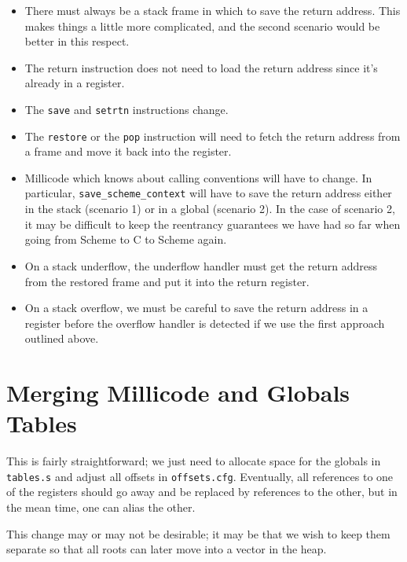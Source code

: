\begin{itemize}
\item
There must always be a stack frame in which to save the return address.
This makes things a little more complicated, and the second scenario would
be better in this respect.

\item
The return instruction does not need to load the return address since it's
already in a register.

\item
The {\tt save} and {\tt setrtn} instructions change.

\item
The {\tt restore} or the {\tt pop} instruction will need to fetch the return
address from a frame and move it back into the register.

\item
Millicode which knows about calling conventions will have to change.
In particular, {\tt save\_scheme\_context} will have to save the return
address either in the stack (scenario 1) or in a global (scenario 2).
In the case of scenario 2, it may be difficult to keep the reentrancy
guarantees we have had so far when going from Scheme to C to Scheme again.

\item
On a stack underflow, the underflow handler must get the return address
from the restored frame and put it into the return register.

\item
On a stack overflow, we must be careful to save the return address
in a register before the overflow handler is detected if we use the first
approach outlined above.

\end{itemize}

\section{Merging Millicode and Globals Tables}

This is fairly straightforward; we just need to allocate space for the globals
in {\tt tables.s} and adjust all offsets in {\tt offsets.cfg}. Eventually,
all references to one of the registers should go away and be replaced by
references to the other, but in the mean time, one can alias the other.

This change may or may not be desirable; it may be that we wish to keep them
separate so that all roots can later move into a vector in the heap.

